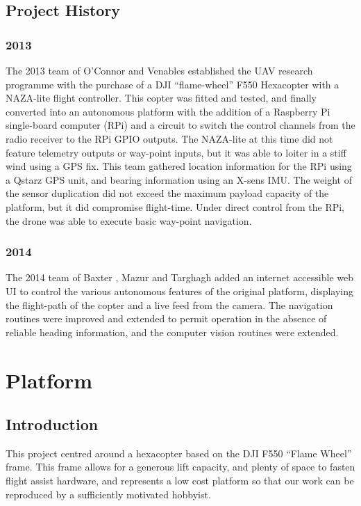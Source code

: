 \documentclass{article}
\begin{document}

    \subsection{Project History}

      \subsubsection{2013}
        The 2013 team of O'Connor \cite{OConnor} and Venables \cite{Venables} established the UAV research programme with the purchase of a DJI ``flame-wheel'' F550 Hexacopter with a NAZA-lite flight controller.  This copter was fitted and tested, and finally converted into an autonomous platform with the addition of a Raspberry Pi single-board computer (RPi) and a circuit to switch the control channels from the radio receiver to the RPi GPIO outputs.
        The NAZA-lite at this time did not feature telemetry outputs or way-point inputs, but it was able to loiter in a stiff wind using a GPS fix.
        This team gathered location information for the RPi using a Qstarz GPS unit, and bearing information using an X-sens IMU.  The weight of the sensor duplication did not exceed the maximum payload capacity of the platform, but it did compromise flight-time.
        Under direct control from the RPi, the drone was able to execute basic way-point navigation.
      \subsubsection{2014}

        The 2014 team of Baxter \cite{Baxter}, Mazur \cite{Mazur} and Targhagh \cite{Targhagh} added an internet accessible web UI to control the various autonomous features of the original platform, displaying the flight-path of the copter and a live feed from the camera.
        The navigation routines were improved and extended to permit operation in the absence of reliable heading information, and the computer vision routines were extended.

  \section{Platform}
    \subsection{Introduction}
      This project centred around a hexacopter based on the DJI F550 ``Flame Wheel'' frame. This frame allows for a generous lift capacity, and plenty of space to fasten flight assist hardware, and represents a low cost platform so that our work can be reproduced by a sufficiently motivated hobbyist.
\end{document}
